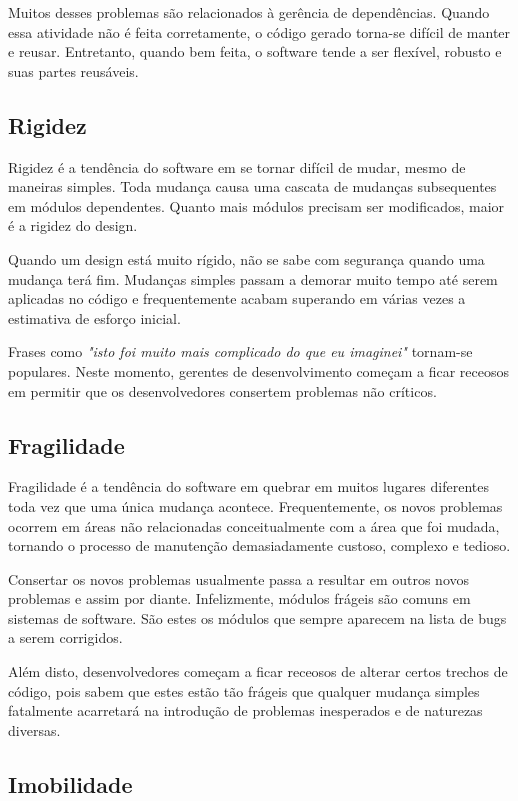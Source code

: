 Muitos desses problemas são relacionados à gerência de dependências. Quando essa
atividade não é feita corretamente, o código gerado torna-se difícil de manter e
reusar. Entretanto, quando bem feita, o software tende a ser flexível, robusto 
e suas partes reusáveis.

\subsection{Rigidez}
\label{subsec:rigidez}

Rigidez é a tendência do software em se tornar difícil de mudar, mesmo de 
maneiras simples. Toda mudança causa uma cascata de mudanças subsequentes  em
módulos dependentes. Quanto mais módulos precisam ser modificados, maior é a
rigidez do design. 

Quando um design está muito rígido, não se sabe com segurança quando uma 
mudança terá fim. Mudanças simples passam a demorar muito tempo até serem 
aplicadas no código e frequentemente acabam superando em várias vezes a 
estimativa de esforço inicial. 

Frases como \textit{"isto foi muito mais complicado do que eu imaginei"} 
tornam-se populares. Neste momento, gerentes de desenvolvimento começam a  ficar
receosos em permitir que os desenvolvedores consertem problemas não críticos.

\subsection{Fragilidade}
\label{subsec:fragilidade}

Fragilidade é a tendência do software em quebrar em muitos lugares diferentes 
toda vez que uma única mudança acontece. Frequentemente, os novos problemas
ocorrem  em áreas não relacionadas conceitualmente com a área que foi mudada, 
tornando o processo de manutenção demasiadamente custoso, complexo e tedioso. 

Consertar os novos problemas usualmente passa a resultar em outros novos
problemas e assim por diante. Infelizmente, módulos frágeis são comuns em
sistemas de software. São estes os módulos que sempre aparecem na lista de bugs
a serem corrigidos. 

Além disto, desenvolvedores começam a ficar receosos de alterar certos trechos 
de código, pois sabem que estes estão tão frágeis que qualquer mudança simples 
fatalmente acarretará na introdução de problemas inesperados e de naturezas
diversas.

\subsection{Imobilidade}

